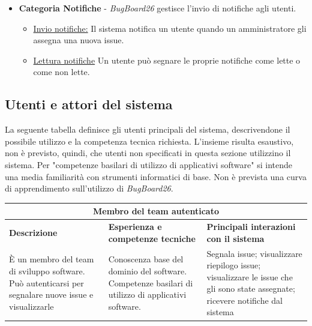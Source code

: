 \documentclass[a4paper,12pt]{article}
\begin{document}
\begin{itemize}
\begin{itemize}
        \item \hyperref[sec:RE07]{Visualizza issue utente:} Gli utenti autenticati possono visualizzare le issue assegnategli da un amministratore.
        \item\hyperref[sec:RE11]{Visualizza notifiche:}  Il sistema fornisce una dashboard per la visualizzazione e gestione delle proprie notifiche.
    \end{itemize}
    \item \textbf{Categoria Notifiche} -  \textit{BugBoard26}  gestisce l'invio di notifiche agli utenti.
    \begin{itemize}
        \item \hyperref[sec:RE04]{Invio notifiche:}  Il sistema notifica un utente quando un amministratore gli assegna una nuova issue.
        \item \hyperref[sec:RE12]{Lettura notifiche}  Un utente può segnare le proprie notifiche come lette o come non lette.
    \end{itemize}
\end{itemize}

\subsection{Utenti e attori del sistema} 
\label{sec:attori}
La seguente tabella definisce gli utenti principali del sistema, descrivendone il possibile utilizzo e la competenza tecnica richiesta. L'insieme risulta esaustivo, non è 
previsto, quindi, che utenti non specificati in questa sezione utilizzino il sistema. Per "competenze basilari di utilizzo di applicativi software" si intende 
una media familiarità con strumenti informatici di base. Non è prevista una curva di apprendimento sull'utilizzo di \textit{BugBoard26}.\\ 

\begin{tabularx}{\textwidth}{|X|X|X|}
\hline
\multicolumn{3}{|c|}{\textbf{Membro del team autenticato}} \\ \hline
\textbf{Descrizione} & \textbf{Esperienza e competenze tecniche} & \textbf{Principali interazioni con il sistema} \\ \hline
È un membro del team di sviluppo software. Può autenticarsi per segnalare nuove issue e visualizzarle & Conoscenza base del dominio del software. Competenze basilari di utilizzo di applicativi software. & Segnala issue; visualizzare riepilogo issue; 
visualizzare le issue che gli sono state assegnate; ricevere notifiche dal sistema \\ \hline
\end{tabularx}
\end{document}
